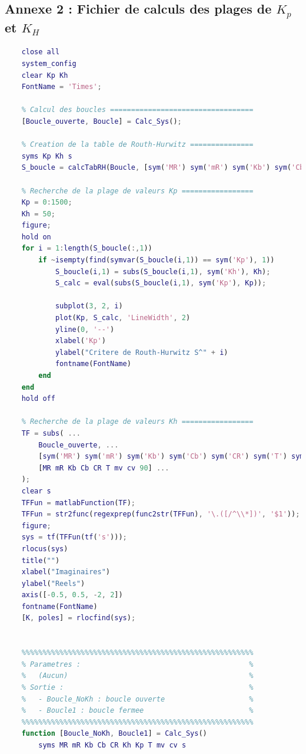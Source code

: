 \documentclass[a4paper,12pt]{article}
\begin{document}
    \subsection{Annexe 2 : Fichier de calculs des plages de $K_p$ et $K_H$} \label{Annexe:calcRHFile}
    \begin{lstlisting}[caption={Fonction simulink de calcul du compensateur}, language=Matlab]
    % Initialisation ======================================
    close all
    system_config
    clear Kp Kh
    FontName = 'Times';

    % Calcul des boucles ==================================
    [Boucle_ouverte, Boucle] = Calc_Sys();

    % Creation de la table de Routh-Hurwitz ===============
    syms Kp Kh s
    S_boucle = calcTabRH(Boucle, [sym('MR') sym('mR') sym('Kb') sym('Cb') sym('CR') sym('T') sym('mv') sym('cv')], [MR mR Kb Cb CR T mv cv], s);

    % Recherche de la plage de valeurs Kp =================
    Kp = 0:1500;
    Kh = 50;
    figure;
    hold on
    for i = 1:length(S_boucle(:,1))
        if ~isempty(find(symvar(S_boucle(i,1)) == sym('Kp'), 1))
            S_boucle(i,1) = subs(S_boucle(i,1), sym('Kh'), Kh);
            S_calc = eval(subs(S_boucle(i,1), sym('Kp'), Kp));
    
            subplot(3, 2, i)
            plot(Kp, S_calc, 'LineWidth', 2)
            yline(0, '--')
            xlabel('Kp')
            ylabel("Critere de Routh-Hurwitz S^" + i)
            fontname(FontName)
        end
    end
    hold off
    
    % Recherche de la plage de valeurs Kh =================
    TF = subs( ...
        Boucle_ouverte, ...
        [sym('MR') sym('mR') sym('Kb') sym('Cb') sym('CR') sym('T') sym('mv') sym('cv') sym('Kp')], ...
        [MR mR Kb Cb CR T mv cv 90] ...
    );
    clear s
    TFFun = matlabFunction(TF);
    TFFun = str2func(regexprep(func2str(TFFun), '\.([/^\\*])', '$1'));
    figure;
    sys = tf(TFFun(tf('s')));
    rlocus(sys)
    title("")
    xlabel("Imaginaires")
    ylabel("Reels")
    axis([-0.5, 0.5, -2, 2])
    fontname(FontName)
    [K, poles] = rlocfind(sys);
    

    %%%%%%%%%%%%%%%%%%%%%%%%%%%%%%%%%%%%%%%%%%%%%%%%%%%%%%%
    % Parametres :                                        %
    %   (Aucun)                                           %
    % Sortie :                                            %
    %   - Boucle_NoKh : boucle ouverte                    %
    %   - Boucle1 : boucle fermee                         %
    %%%%%%%%%%%%%%%%%%%%%%%%%%%%%%%%%%%%%%%%%%%%%%%%%%%%%%%
    function [Boucle_NoKh, Boucle1] = Calc_Sys()
        syms MR mR Kb Cb CR Kh Kp T mv cv s


\end{lstlisting}
\end{document}
